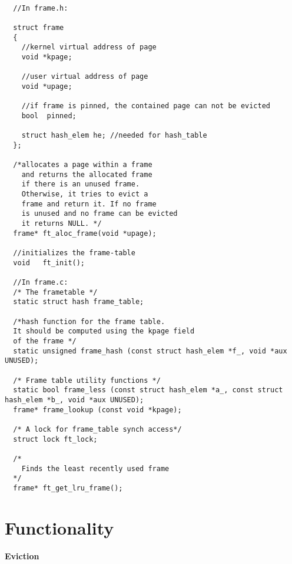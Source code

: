 \begin{lstlisting}

  //In frame.h:

  struct frame
  {
	//kernel virtual address of page
	void *kpage; 	
	  
	//user virtual address of page
	void *upage;	
	
	//if frame is pinned, the contained page can not be evicted
	bool  pinned;		
	
	struct hash_elem he; //needed for hash_table
  };

  /*allocates a page within a frame
    and returns the allocated frame
    if there is an unused frame.
    Otherwise, it tries to evict a 
    frame and return it. If no frame
    is unused and no frame can be evicted
    it returns NULL. */
  frame* ft_aloc_frame(void *upage);
  
  //initializes the frame-table
  void	 ft_init();

  //In frame.c:
  /* The frametable */
  static struct hash frame_table;

  /*hash function for the frame table.
  It should be computed using the kpage field
  of the frame */
  static unsigned frame_hash (const struct hash_elem *f_, void *aux UNUSED);
  
  /* Frame table utility functions */
  static bool frame_less (const struct hash_elem *a_, const struct hash_elem *b_, void *aux UNUSED);
  frame* frame_lookup (const void *kpage);

  /* A lock for frame_table synch access*/
  struct lock ft_lock;

  /*
    Finds the least recently used frame
  */
  frame* ft_get_lru_frame();

\end{lstlisting}

\section{Functionality}

\textbf{Eviction}

